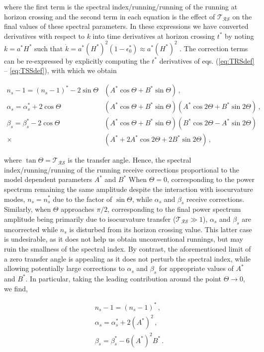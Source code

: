 \documentclass[universe,preprints,oneauthor,pdftex,10pt,a4paper]{mdpi}
\newcommand{\rpar}[1]{\left(#1\right)}
\newcommand{\TRS}{\mathcal{T}_\mathcal{RS}}
\begin{document}
where the first term is the spectral index/running/running of the running at horizon crossing and the second term in each equation is the effect of $\TRS$ on the final values of these spectral parameters. In these expressions we have converted derivatives with respect to $k$ into time derivatives at horizon crossing $t^*$ by noting $k = a^* H^*$ such that $\dot{k} = a^* (H^*)^2 (1 - \epsilon_0^*) \approx a^* (H^*)^2$ . The correction terms can be re-expressed by explicitly computing the $t^*$ derivatives of eqs. (\ref{eq:TRSdef} -- \ref{eq:TSSdef}), with which we obtain \cite{vandeBruck:2016rfv}

\begin{align}
n_s - 1 =(n_s-1)^*  - 2 \sin \Theta & \rpar{A^* \cos \Theta + B^* \sin \Theta}\, ,\label{eq:ns} \\
\alpha_s =\alpha_s^*+ 2 \cos \Theta & \rpar{A^* \cos \Theta + B^* \sin \Theta}\rpar{A^* \cos 2 \Theta + B^* \sin 2 \Theta} \, ,\label{eq:alpha}\\
\beta_s =\beta_s^*   -  2 \cos \Theta & \rpar{A^* \cos \Theta + B^* \sin \Theta} \rpar{B^* \cos 2 \Theta - A^* \sin 2 \Theta} \nonumber \\
\times &  \rpar{A^* + 2A^* \cos 2\Theta + 2 B^* \sin 2 \Theta}\, ,\label{eq:beta}
\end{align}

where $\tan \Theta = \TRS$ is the transfer angle. Hence, the spectral index/running/running of the running receive corrections proportional to the model dependent parameters $A^*$ and $B^*$ When $\Theta = 0$, corresponding to the power spectrum remaining the same amplitude despite the interaction with isocurvature modes, $n_s = n_s^*$ due to the factor of $\sin \Theta$, while $\alpha_s$ and $\beta_s$ receive corrections. Similarly, when $\Theta$ approaches $\pi/2$, corresponding to the final power spectrum amplitude being primarily due to isocurvature transfer ($\TRS \gg 1$), $\alpha_s$ and $\beta_s$ are uncorrected while $n_s$ is disturbed from its horizon crossing value. This latter case is undesirable, as it does not help us obtain unconventional runnings, but may ruin the smallness of the spectral index. By contrast, the aforementioned limit of a zero transfer angle is appealing as it does not perturb the spectral index, while allowing potentially large corrections to $\alpha_s$ and $\beta_s$ for appropriate values of $A^*$ and $B^*$. In particular, taking the leading contribution around the point $\Theta \rightarrow 0$, we find,

\begin{align}
n_s - 1 =(n_s-1)^* \, , \\
\alpha_s =\alpha_s^*+ 2 (A^*)^2  \, ,\\
\beta_s =\beta_s^*   -  6 (A^*)^2 B^* \, .
\end{align}
\end{document}
